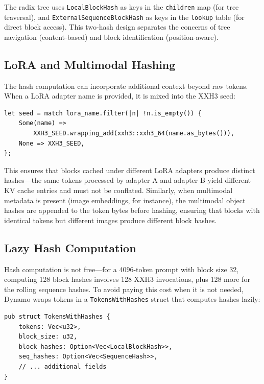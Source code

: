 \begin{insightbox}
The radix tree uses \texttt{LocalBlockHash} as keys in the \texttt{children} map (for tree traversal), and \texttt{ExternalSequenceBlockHash} as keys in the \texttt{lookup} table (for direct block access). This two-hash design separates the concerns of tree navigation (content-based) and block identification (position-aware).
\end{insightbox}

\subsection{LoRA and Multimodal Hashing}

The hash computation can incorporate additional context beyond raw tokens. When a LoRA adapter name is provided, it is mixed into the XXH3 seed:

\begin{verbatim}
let seed = match lora_name.filter(|n| !n.is_empty()) {
    Some(name) =>
        XXH3_SEED.wrapping_add(xxh3::xxh3_64(name.as_bytes())),
    None => XXH3_SEED,
};
\end{verbatim}

This ensures that blocks cached under different LoRA adapters produce distinct hashes---the same tokens processed by adapter A and adapter B yield different KV cache entries and must not be conflated. Similarly, when multimodal metadata is present (image embeddings, for instance), the multimodal object hashes are appended to the token bytes before hashing, ensuring that blocks with identical tokens but different images produce different block hashes.

\subsection{Lazy Hash Computation}

Hash computation is not free---for a 4096-token prompt with block size 32, computing 128 block hashes involves 128 XXH3 invocations, plus 128 more for the rolling sequence hashes. To avoid paying this cost when it is not needed, Dynamo wraps tokens in a \texttt{TokensWithHashes} struct that computes hashes lazily:

\begin{verbatim}
pub struct TokensWithHashes {
    tokens: Vec<u32>,
    block_size: u32,
    block_hashes: Option<Vec<LocalBlockHash>>,
    seq_hashes: Option<Vec<SequenceHash>>,
    // ... additional fields
}
\end{verbatim}

